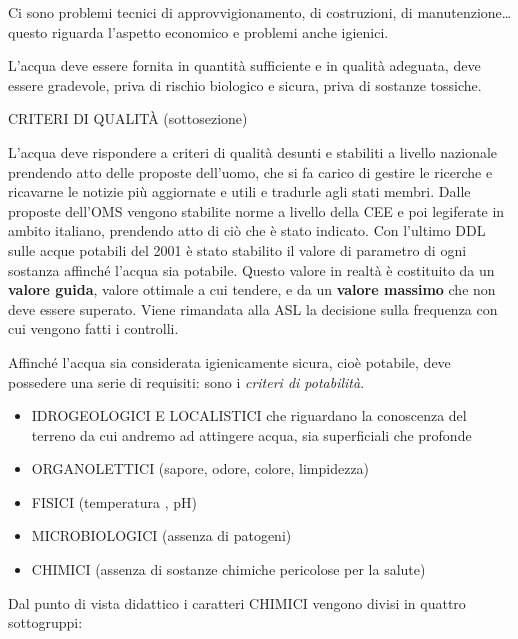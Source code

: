 \documentclass[]{article}
\begin{document}
Ci sono problemi tecnici di approvvigionamento, di costruzioni, di
manutenzione\ldots{} questo riguarda l'aspetto economico e problemi
anche igienici.

L'acqua deve essere fornita in quantità sufficiente e in qualità
adeguata, deve essere gradevole, priva di rischio biologico e sicura,
priva di sostanze tossiche.

CRITERI DI QUALITÀ (sottosezione)

L'acqua deve rispondere a criteri di qualità desunti e stabiliti a
livello nazionale prendendo atto delle proposte dell'uomo, che si fa
carico di gestire le ricerche e ricavarne le notizie più aggiornate e
utili e tradurle agli stati membri. Dalle proposte dell'OMS vengono
stabilite norme a livello della CEE e poi legiferate in ambito italiano,
prendendo atto di ciò che è stato indicato. Con l'ultimo DDL sulle acque
potabili del 2001 è stato stabilito il valore di parametro di ogni
sostanza affinché l'acqua sia potabile. Questo valore in realtà è
costituito da un \textbf{valore guida}, valore ottimale a cui tendere, e
da un \textbf{valore massimo} che non deve essere superato. Viene
rimandata alla ASL la decisione sulla frequenza con cui vengono fatti i
controlli.

Affinché l'acqua sia considerata igienicamente sicura, cioè potabile,
deve possedere una serie di requisiti: sono i \emph{criteri di
potabilità}.

\begin{itemize}
\item
  IDROGEOLOGICI E LOCALISTICI che riguardano la conoscenza del terreno
  da cui andremo ad attingere acqua, sia superficiali che profonde
\end{itemize}

\begin{itemize}
\item
  ORGANOLETTICI (sapore, odore, colore, limpidezza)
\item
  FISICI (temperatura , pH)
\item
  MICROBIOLOGICI (assenza di patogeni)
\item
  CHIMICI (assenza di sostanze chimiche pericolose per la salute)
\end{itemize}

Dal punto di vista didattico i caratteri CHIMICI vengono divisi in
quattro sottogruppi:
\end{document}
